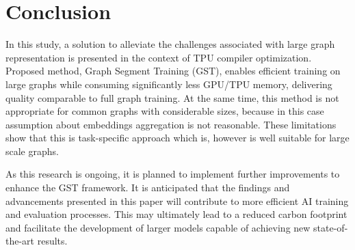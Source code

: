 \documentclass{article}
\begin{document}
\section{Conclusion}
In this study, a solution to alleviate the challenges associated with large graph representation is presented in the context of TPU compiler optimization. Proposed method, Graph Segment Training (GST), enables efficient training on large graphs while consuming significantly less GPU/TPU memory, delivering quality comparable to full graph training. At the same time, this method is not appropriate for common graphs with considerable sizes, because in this case assumption about embeddings aggregation is not reasonable. These limitations show that this is task-specific approach which is, however is well suitable for large scale graphs.

As this research is ongoing, it is planned to implement further improvements to enhance the GST framework. It is anticipated that the findings and advancements presented in this paper will contribute to more efficient AI training and evaluation processes. This may ultimately lead to a reduced carbon footprint and facilitate the development of larger models capable of achieving new state-of-the-art results.

\newpage


\end{document}
